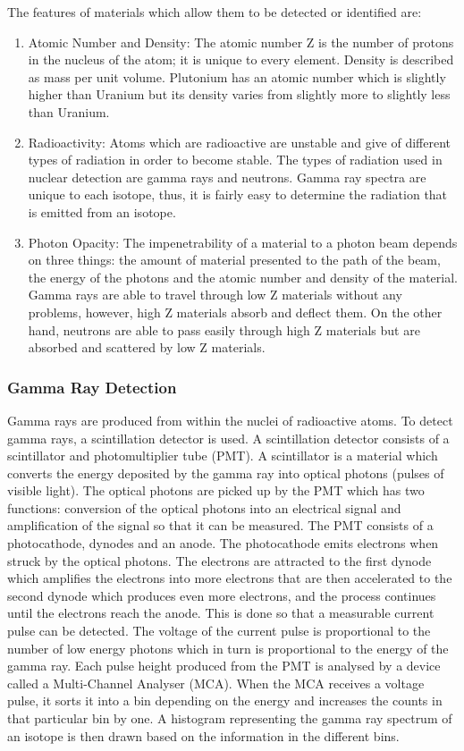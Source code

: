 \documentclass[twoside,titlepage,11pt,twocolumn,a4paper]{article}
\begin{document}
The features of materials which allow them to be detected or
identified are:
\begin{enumerate}
\item Atomic Number and Density: The atomic number Z is the number
  of protons in the nucleus of the atom; it is unique to every
  element. Density is described as mass per unit volume. Plutonium has
  an atomic number which is slightly higher than Uranium but its
  density varies from slightly more to slightly less than Uranium.
  \citep{medalia2007}
\item Radioactivity: Atoms which are radioactive are unstable and give
  of different types of radiation in order to become stable. The types
  of radiation used in nuclear detection are gamma rays and
  neutrons. Gamma ray spectra are unique to each
  isotope, thus, it is fairly easy to determine the radiation that is
  emitted from an isotope. \citep{medalia2007} 
\item Photon Opacity: The impenetrability of a material to a photon
  beam depends on three things: the amount of material presented to
  the path of the beam, the energy of the photons and the atomic
  number and density of the material. Gamma rays are able to travel
  through low Z materials without any problems, however, high Z
  materials absorb and deflect them. On the other hand, neutrons are
  able to pass easily through high Z materials but are absorbed and
  scattered by low Z materials. \citep{medalia2007}
\end{enumerate}

\subsubsection{Gamma Ray Detection}
Gamma rays are produced from within the nuclei of radioactive
atoms. \citep{bushberg1994} To detect gamma rays, a scintillation
detector is used. A scintillation detector consists of a scintillator
and photomultiplier tube (PMT). A scintillator is a material which
converts the energy deposited by the gamma ray into optical photons
(pulses of visible light). The optical photons are picked up by the
PMT which has two functions: conversion of the optical photons into an
electrical signal and amplification of the signal so that it can be
measured. The PMT consists of a photocathode, dynodes and an
anode. The photocathode emits electrons when struck by the optical
photons.  The electrons are attracted to the first dynode which
amplifies the electrons into more electrons that are then accelerated
to the second dynode which produces even more electrons, and the
process continues until the electrons reach the anode. This is done so
that a measurable current pulse can be detected. The voltage of the
current pulse is proportional to the number of low energy photons
which in turn is proportional to the energy of the gamma ray. Each
pulse height produced from the PMT is analysed by a device called a
Multi-Channel Analyser (MCA). When the MCA receives a voltage pulse,
it sorts it into a bin depending on the energy and increases the
counts in that particular bin by one. A histogram representing the
gamma ray spectrum of an isotope is then drawn based on the
information in the different bins. \citep{medalia2007,bushberg1994}
\end{document}
